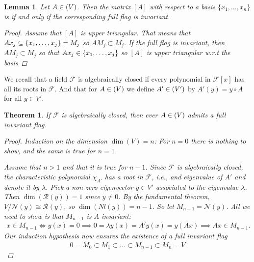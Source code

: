 \documentclass[10pt,twoside,openany,final]{memoir}
\theoremstyle{break}
\newtheorem{theorem}[section]{Theorem}
\newtheorem{lemma}[section]{Lemma}
\theoremstyle{Break}
\let\End\relax
\DeclareMathOperator{\End}{End}
\newcommand{\F}{\mathcal{F}}
\newcommand{\Rg}{\mathcal{R}}
\newcommand{\Nl}{\mathcal{N}}
\let\Span\relax
\DeclareMathOperator{\Span}{Span}
\let\emph\relax
\begin{document}
\begin{lemma}
	Let $A\in \End(V)$. Then the matrix $[A]$ with respect to a basis $\{x_1,\dots,x_n\}$ is \emph{upper triangular} if and only if the corresponding full flag is invariant.
	\begin{proof}
		Assume that $[A]$ is upper triangular. That means that $Ax_j \subseteq \Span\left\{ x_1,\dots,x_j \right\}=M_j$ so $AM_j \subset M_j$. If the full flag is invariant, then $A M_j \subset M_j$ so that $Ax_j \in \Span\left\{ x_1,\dots,x_j \right\}$ so $[A]$ is upper triangular w.r.t the basis	
	\end{proof}
\end{lemma}
We recall that a field $\F$ is algebraically closed if every polynomial in $\F[x]$ has all its roots in $\F$. And that for $A \in \End(V)$ we define $A' \in \End(V')$ by $A'(y)=y \circ A$ for all $y \in V'$.
\begin{theorem}
	If $\F$ is algebraically closed, then ever $A \in \End(V)$ admits a full invariant flag.
	\begin{proof}
	Induction on the dimension $\dim(V)=n$: For $n=0$ there is nothing to show, and the same is true for $n=1$.
	
	Assume that $n>1$ and that it is true for $n-1$. Since $\F$ is algebraically closed, the characteristic polynomial $\chi_{A'}$ has a root in $\F$, i.e., and eigenvalue of $A'$ and denote it by $\lambda$. Pick a non-zero eigenvector $y \in V'$ associated to the eigenvalue $\lambda$. Then $\dim(\Rg(y))=1$ since $y \neq 0$. By the fundamental theorem, $V / \Nl(y)\cong \Rg(y)$, so $\dim(Nl(y))=n-1$. So let $M_{n-1}=\Nl(y)$. All we need to show is that $M_{n-1}$ is $A$-invariant:
	\begin{align*}
		x \in M_{n-1} \iff y(x)=0 \implies 0= \lambda y(x)=A'y(x)=y(Ax) \implies Ax \in M_{n-1}.
	\end{align*}
	Our induction hypothesis now ensures the existence of a full invariant flag 
	\begin{align*}
		0=M_0\subset M_1 \subset \dots \subset M_{n-1}\subset M_n=V
	\end{align*}
	\end{proof}
\end{theorem}
\end{document}
